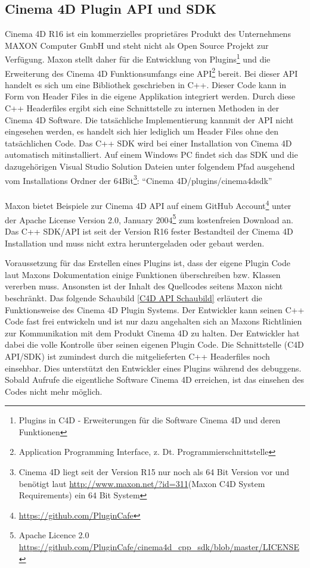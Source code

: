 \documentclass[pagesize, paper=a4, fontsize=12pt, titlepage=true, headings=small, headnosepline, abstractoff, liststotoc, nochapterprefix, plainheadsepline, twoside]{scrreprt}
\begin{document}
\subsection{Cinema 4D Plugin API und SDK}
Cinema 4D R16 \autocite{MaxonC4d2014} ist ein kommerzielles proprietäres Produkt des Unternehmens MAXON Computer GmbH und steht nicht als Open Source Projekt zur Verfügung. Maxon stellt daher für die Entwicklung von Plugins\footnote{Plugins in C4D - Erweiterungen für die Software Cinema 4D und deren Funktionen} und die Erweiterung des Cinema 4D Funktionsumfangs eine API\footnote{Application Programming Interface, z. Dt. Programmierschnittstelle} bereit. Bei dieser API handelt es sich um eine Bibliothek geschrieben in C++. Dieser Code kann in Form von Header Files in die eigene Applikation integriert werden. Durch diese C++ Headerfiles ergibt sich eine Schnittstelle zu internen Methoden in der Cinema 4D Software. Die tatsächliche Implementierung kannmit der API nicht eingesehen werden, es handelt sich hier lediglich um Header Files ohne den tatsächlichen Code. Das C++ SDK wird bei einer Installation von Cinema 4D automatisch mitinstalliert. Auf einem Windows PC findet sich das SDK und die dazugehörigen Visual Studio Solution Dateien unter folgendem Pfad ausgehend vom Installations Ordner der 64Bit\footnote{Cinema 4D liegt seit der Version R15 nur noch als 64 Bit Version vor und benötigt laut \url{http://www.maxon.net/?id=311}(Maxon C4D System Requirements) ein 64 Bit System}: {“Cinema 4D/plugins/cinema4dsdk”}
\\
\\
Maxon bietet Beispiele zur Cinema 4D API auf einem GitHub Account\footnote{\url{https://github.com/PluginCafe}} unter der Apache License Version 2.0, January 2004\footnote{Apache Licence 2.0 \url{https://github.com/PluginCafe/cinema4d_cpp_sdk/blob/master/LICENSE}} zum kostenfreien Download an. Das C++ SDK/API ist seit der Version R16 fester Bestandteil der Cinema 4D Installation und muss nicht extra heruntergeladen oder gebaut werden.

Voraussetzung für das Erstellen eines Plugins ist, dass der eigene Plugin Code laut Maxons Dokumentation einige Funktionen überschreiben bzw. Klassen vererben muss. Ansonsten ist der Inhalt des Quellcodes seitens Maxon nicht beschränkt. Das folgende Schaubild \ref{C4D API Schaubild} erläutert die Funktionsweise des Cinema 4D Plugin Systems. Der Entwickler kann seinen C++ Code fast frei entwickeln und ist nur dazu angehalten sich an Maxons Richtlinien zur Kommunikation mit dem Produkt Cinema 4D zu halten. Der Entwickler hat dabei die volle Kontrolle über seinen eigenen Plugin Code. Die Schnittstelle (C4D API/SDK) ist zumindest durch die mitgelieferten C++ Headerfiles noch einsehbar. Dies unterstützt den Entwickler eines Plugins während des debuggens. Sobald Aufrufe die eigentliche Software Cinema 4D erreichen, ist das einsehen des Codes nicht mehr möglich.
\end{document}
